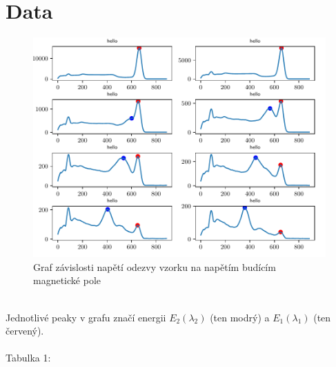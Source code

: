 \documentclass{article}
\begin{document}
\section{}
\newpage
\section{Data}
\begin{figure}[h]
  \hspace*{-1em}
  \includegraphics[scale=0.8]{figs/fig1.pdf}
  \caption{Graf závislosti napětí odezvy vzorku na napětím budícím magnetické pole}
\end{figure}
\\
Jednotlivé peaky v grafu značí energii $E_{2}(\lambda_{2})$ (ten modrý) a $E_{1}(\lambda_{1})$ (ten červený).\\
\\
\footnotesize{Tabulka 1:}\\
\end{document}
